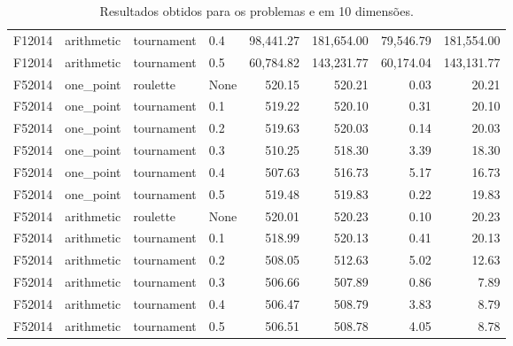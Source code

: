 \begin{table}[!ht]
{\begin{tabular}{llllrrrr}
            F12014                                     & arithmetic & tournament & 0.4  & 98,441.27    & 181,654.00    & 79,546.79    & 181,554.00    \\
            F12014                                     & arithmetic & tournament & 0.5  & 60,784.82    & 143,231.77    & 60,174.04    & 143,131.77    \\
            F52014                                     & one\_point & roulette   & None & 520.15       & 520.21        & 0.03         & 20.21         \\
            F52014                                     & one\_point & tournament & 0.1  & 519.22       & 520.10        & 0.31         & 20.10         \\
            F52014                                     & one\_point & tournament & 0.2  & 519.63       & 520.03        & 0.14         & 20.03         \\
            F52014                                     & one\_point & tournament & 0.3  & 510.25       & 518.30        & 3.39         & 18.30         \\
            F52014                                     & one\_point & tournament & 0.4  & 507.63       & 516.73        & 5.17         & 16.73         \\
            F52014                                     & one\_point & tournament & 0.5  & 519.48       & 519.83        & 0.22         & 19.83         \\
            F52014                                     & arithmetic & roulette   & None & 520.01       & 520.23        & 0.10         & 20.23         \\
            F52014                                     & arithmetic & tournament & 0.1  & 518.99       & 520.13        & 0.41         & 20.13         \\
            F52014                                     & arithmetic & tournament & 0.2  & 508.05       & 512.63        & 5.02         & 12.63         \\
            F52014                                     & arithmetic & tournament & 0.3  & 506.66       & 507.89        & 0.86         & 7.89          \\
            F52014                                     & arithmetic & tournament & 0.4  & 506.47       & 508.79        & 3.83         & 8.79          \\
            F52014                                     & arithmetic & tournament & 0.5  & 506.51       & 508.78        & 4.05         & 8.78          \\
            \toprule
        \end{tabular}%
    }
    \caption{Resultados obtidos para os problemas  e  em 10 dimensões.
    }%
    \label{tab:fitness_10}
\end{table}


